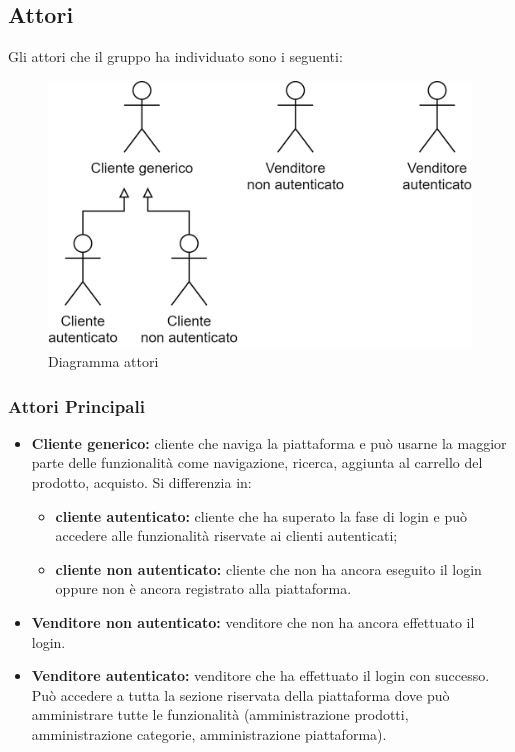 \subsection{Attori}
Gli attori che il gruppo ha individuato sono i seguenti:
\begin{figure}[H]
    \centering
    \includegraphics[width=32em]{res/images/UC/attori.png}
    \caption{Diagramma attori} 
\end{figure}
\subsubsection{Attori Principali}
\begin{itemize}
    \item \textbf{Cliente generico:} cliente che naviga la piattaforma e può usarne la maggior parte delle funzionalità come navigazione, ricerca, aggiunta al carrello del prodotto, acquisto. Si differenzia in: 
    \begin{itemize}
        \item \textbf{cliente autenticato:} cliente che ha superato la fase di login e può accedere alle funzionalità riservate ai clienti autenticati;
        \item \textbf{cliente non autenticato:} cliente che non ha ancora eseguito il login oppure non è ancora registrato alla piattaforma. 
    \end{itemize}
    \item \textbf{Venditore non autenticato:} venditore che non ha ancora effettuato il login.
    \item \textbf{Venditore autenticato:} venditore che ha effettuato il login con successo. Può accedere a tutta la sezione riservata della piattaforma dove può amministrare tutte le funzionalità (amministrazione prodotti, amministrazione categorie, amministrazione piattaforma).
\end{itemize}
